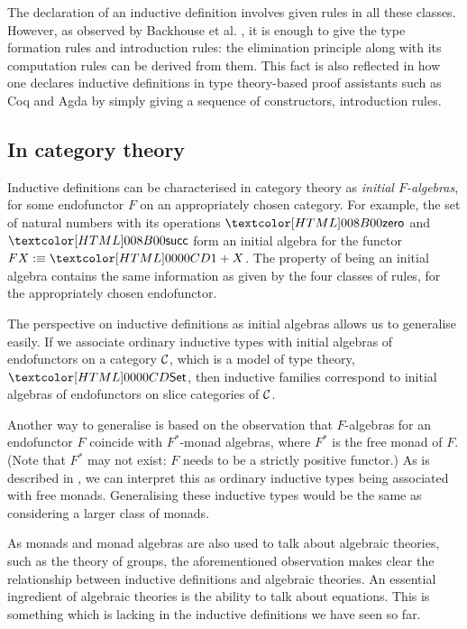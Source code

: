The declaration of an inductive definition involves given rules in all
these classes. However, as observed by Backhouse et
al. \cite{Backhouse1989}, it is enough to give the type formation
rules and introduction rules: the elimination principle along with its
computation rules can be derived from them. This fact is also
reflected in how one declares inductive definitions in type
theory-based proof assistants such as Coq \cite{Bertot2004} and Agda
by simply giving a sequence of constructors, \ie introduction rules.

\subsection{In category theory}
\label{in-category-theory}

Inductive definitions can be characterised in category theory as
\emph{initial $F$-algebras}, for some endofunctor $F$ on an
appropriately chosen category. For example, the set of natural numbers
with its operations $\natzero$ and $\natsucc$ form an initial algebra
for the functor $F X \ddefeq \unitty + X$. The property of being an
initial algebra contains the same information as given by the four
classes of rules, for the appropriately chosen endofunctor. 

The perspective on inductive definitions as initial algebras allows us
to generalise easily. If we associate ordinary inductive types with
initial algebras of endofunctors on a category $\mathcal{C}$, which is a model
of type theory, \eg $\Set$, then inductive families correspond to
initial algebras of endofunctors on slice categories of
$\mathcal{C}$. 


Another way to generalise is based on the observation that
$F$-algebras for an endofunctor $F$ coincide with $F^*$-monad
algebras, where $F^*$ is the free monad of $F$. (Note that $F^*$ may
not exist: $F$ needs to be a strictly positive functor.) As is
described in \cite{Shulman2011}, we can interpret this as ordinary
inductive types being associated with free monads. Generalising these
inductive types would be the same as considering a larger class of monads. 

As monads and monad algebras are also used to talk about algebraic
theories, such as the theory of groups, the aforementioned observation
makes clear the relationship between inductive definitions and
algebraic theories. An essential ingredient of algebraic theories is
the ability to talk about equations. This is something which is
lacking in the inductive definitions we have seen so far.

